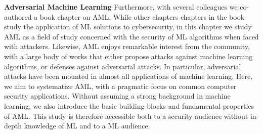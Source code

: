\textbf{Adversarial Machine Learning}
Furthermore, with several colleagues we co-authored a book chapter on \gls{AML}.
While other chapters chapters in the book study the application of ML solutions to cybersecurity, in this chapter we study \gls{AML} as a field of study concerned with the security of ML algorithms when faced with attackers.
Likewise, \gls{AML} enjoys remarkable interest from the community, with a large body of works that either propose attacks against machine learning algorithms, or defenses against adversarial attacks.
In particular, adversarial attacks have been mounted in almost all applications of machine learning.
Here, we aim to systematize \gls{AML}, with a pragmatic focus on common computer security applications. Without assuming a strong background in machine learning, we also introduce the basic building blocks and fundamental properties of \gls{AML}.
This study is therefore accessible both to a security audience without in-depth knowledge of ML and to a ML audience.

\begin{myleftbar}
\end{myleftbar}



